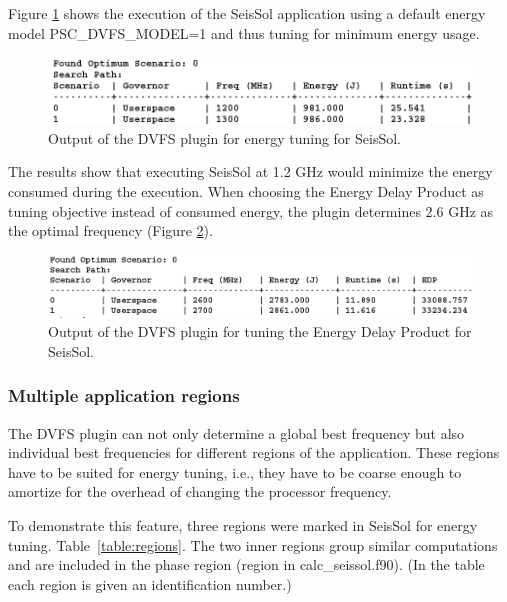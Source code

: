 Figure \ref{fig:uc2_dvfs_result} shows the execution of the SeisSol application using a default energy model PSC\_DVFS\_MODEL=1 and thus tuning for minimum energy usage. 
	
\begin{figure}[H]
	\centering
	\includegraphics[scale=0.65]{../BPG/images/uc2_dvfs_result.png}
	\caption{Output of the DVFS plugin for energy tuning for SeisSol.}
	\label{fig:uc2_dvfs_result}
\end{figure}

The results show that executing SeisSol at 1.2 GHz would minimize the energy consumed during the execution. When choosing the Energy Delay Product as tuning objective instead of consumed energy, the plugin determines 2.6 GHz as the optimal frequency (Figure \ref{fig:uc3_dvfs_model_3_results}).

\begin{figure}[H]
	\centering
	\includegraphics[scale=0.65, width=\textwidth]{../BPG/images/uc3_dvfs_model_3_results.png}
	\caption{Output of the DVFS plugin for tuning the Energy Delay Product for SeisSol.}
	\label{fig:uc3_dvfs_model_3_results}
\end{figure}


\subsubsection{Multiple application regions}

The DVFS plugin can not only determine a global best frequency but also individual best frequencies for different regions of the application. These regions have to be suited for energy tuning, i.e., they have to be coarse enough to amortize for the overhead of changing the processor frequency. 

To demonstrate this feature, three regions were marked in SeisSol for energy tuning. Table~\ref{table:regions}. The two inner regions group similar computations and are included in the phase region (region in calc\_seissol.f90). (In the table each region is given an identification number.)

